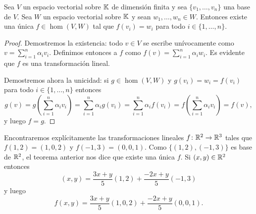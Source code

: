\begin{thm}
    Sea $V$ un espacio vectorial sobre $\mathbb{K}$ de dimensión finita y sea
    $\{v_1,\dots,v_n\}$ una base de $V$.  Sea $W$ un espacio vectorial sobre
    $\mathbb{K}$ y sean $w_1,\dots,w_n\in W$. Entonces existe una única 
    $f\in\hom(V,W)$ tal que $f(v_i)=w_i$ para todo $i\in\{1,\dots,n\}$. 

    \begin{proof}
        Demostremos la existencia: todo $v\in V$ se escribe unívocamente como
        $v=\sum_{i=1}^n\alpha_iv_i$. Definimos entonces a $f$ como
        $f(v)=\sum_{i=1}^n\alpha_iw_i$. Es evidente que $f$ es una
        transformación lineal.
        
        Demostremos ahora la unicidad: si 
        $g\in\hom(V,W)$ y $g(v_i)=w_i=f(v_i)$ para todo $i\in\{1,\dots,n\}$ entonces 
        \[
        g(v)=g\left(\sum_{i=1}^n\alpha_iv_i\right)=\sum_{i=1}^n\alpha_ig(v_i)=\sum_{i=1}^n\alpha_if(v_i)=f\left(\sum_{i=1}^n\alpha_iv_i\right)=f(v),
        \] y luego $f=g$.
    \end{proof}
\end{thm}

\begin{example}
    Encontraremos explícitamente las transformaciones lineales $f\colon\mathbb{R}^2\to\mathbb{R}^3$ tales que $f(1,2)=(1,0,2)$ y $f(-1,3)=(0,0,1)$. Como $\{(1,2),(-1,3)\}$ es base de $\mathbb{R}^2$,
    el teorema anterior nos dice que existe una única $f$. Si $(x,y)\in\mathbb{R}^2$ entonces
    \[
        (x,y)=\frac{3x+y}{5}(1,2)+\frac{-2x+y}{5}(-1,3)
    \]
    y luego 
    \[
        f(x,y)=\frac{3x+y}{5}(1,0,2)+\frac{-2x+y}{5}(0,0,1).
    \]
\end{example}

